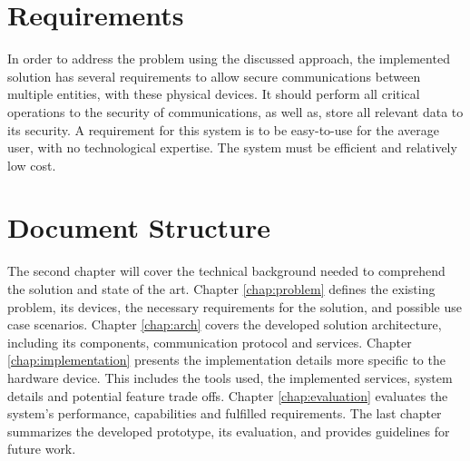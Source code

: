 \section{Requirements}\label{chap:intro:requirements}

In order to address the problem using the discussed approach, the implemented solution has several requirements to allow secure communications between multiple entities, with these physical devices.
It should perform all critical operations to the security of communications, as well as, store all relevant data to its security. A requirement for this system is to be easy-to-use for the average user, with no technological expertise. The system must be efficient and relatively low cost.

\section{Document Structure}\label{chap:intro:doc}

The second chapter will cover the technical background needed to comprehend the solution and state of the art.
Chapter \ref{chap:problem} defines the existing problem, its devices, the necessary requirements for the solution, and possible use case scenarios.
Chapter \ref{chap:arch} covers the developed solution architecture, including its components, communication protocol and services.
Chapter \ref{chap:implementation} presents the implementation details more specific to the hardware device. This includes the tools used, the implemented services, system details and potential feature trade offs. Chapter \ref{chap:evaluation} evaluates the system's performance, capabilities and fulfilled requirements. The last chapter summarizes the developed prototype, its evaluation, and provides guidelines for future work.
